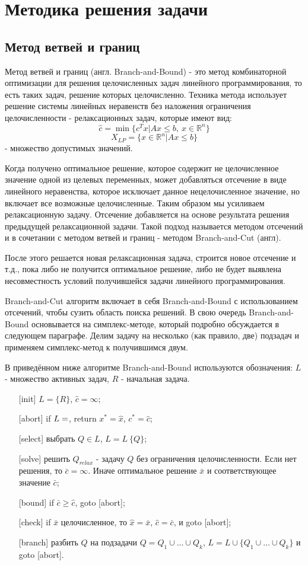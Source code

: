 \documentclass[a4paper,14pt,russian]{extreport}
\begin{document}
\chapter{Методика решения задачи}

\section{Метод ветвей и границ}

Метод ветвей и границ (англ. Branch-and-Bound) - это метод комбинаторной оптимизации для решения целочисленных задач линейного программирования, то есть таких задач, решение которых целочисленно. Техника метода использует решение системы линейных неравенств без наложения ограничения целочисленности - релаксационных задач, которые имеют вид: 
  $$\hat c = \min \{c^Tx|Ax\le b,~ x\in\mathbb{R}^n\}$$
  $$X_{LP} = \{x \in \mathbb{R}^n | Ax \le b\}$$ - множество допустимых значений. 
\par Когда получено оптимальное решение, которое содержит не целочисленное значение одной из целевых переменных, может добавляться отсечение в виде линейного неравенства, которое исключает данное нецелочисленное значение, но включает все возможные целочисленные. Таким образом мы усиливаем релаксационную задачу. Отсечение добавляется на основе результата решения предыдущей релаксационной задачи. Такой подход называется методом отсечений и в сочетании с методом ветвей и границ - методом Branch-and-Cut (англ). 
\par После этого решается новая релаксационная задача, строится новое отсечение и т.д., пока либо не получится оптимальное решение, либо не будет выявлена несовместность условий получившейся задачи линейного программирования. 
\par Branch-and-Cut алгоритм включает в себя Branch-and-Bound с использованием отсечений, чтобы сузить область поиска решений. В свою очередь Branch-and-Bound основывается на симплекс-методе, который подробно обсуждается в следующем параграфе. Делим задачу на несколько (как правило, две) подзадач и применяем симплекс-метод к получившимся двум.
\par В приведённом ниже алгоритме Branch-and-Bound используются обозначения: $L$ - множество активных задач, $R$ - начальная задача. 
  \begin{enumerate}
  \item[{[init]}] $L = \{R\}$, $\hat c = \infty$;
  \item[{[abort]}] if $L = \empty$, return $x^*=\hat x$, $c^* = \hat c$;
  \item[[{select]}] выбрать $Q\in L$, $L = L \ \{ Q \}$;
  \item[[{solve]}] решить $Q_{relax}$ - задачу $Q$ без ограничения целочисленности. Если нет решения, то $\bar c = \infty$. Иначе оптимальное решение $\bar x$ и соответствующее значение $\bar c$;
  \item[{[bound]}] if $\bar c \ge \hat c$, goto [abort];
  \item[{[check]}] if $\bar x$ целочисленное, то $\hat x = \bar x$, $\hat c = \bar c$, и goto [abort];
  \item[{[branch]}] разбить $Q$ на подзадачи $Q = Q_1 \cup \dots \cup Q_k$, $L = L \cup \{Q_1 \cup \dots \cup Q_k \}$ и goto [abort].
  \end{enumerate}
\end{document}
